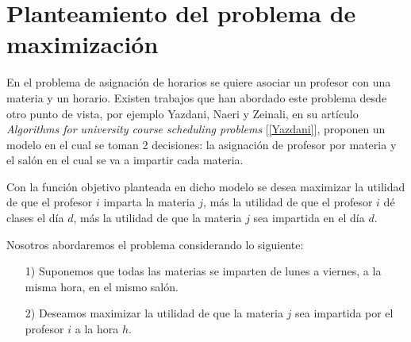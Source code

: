 

  
%
%

  
  
  \section{Planteamiento del problema de maximización}

En el problema de asignación de horarios se quiere asociar un profesor con una materia y un horario. Existen trabajos que han abordado este problema desde otro punto de vista, por ejemplo Yazdani, Naeri y Zeinali, en su artículo \textit{Algorithms for university course scheduling problems} [\ref{Yazdani}], proponen un modelo en el cual se toman 2 decisiones: la asignación de profesor por materia y el salón en el cual se va a impartir cada materia.

Con la función objetivo planteada en dicho modelo se desea maximizar la utilidad de que el profesor $i$ imparta la materia $j$, más la utilidad de que el profesor $i$ dé clases el día $d$, más la utilidad de que la materia $j$ sea impartida en el día $d$.

Nosotros abordaremos el problema considerando lo siguiente: %

\begin{enumerate}
\item[1)] Suponemos que todas las materias se imparten de lunes a viernes, a la misma hora, en el mismo salón. %

\item[2)] Deseamos maximizar la utilidad de que la materia $j$ sea impartida por  el profesor $i$ a la hora $h$.
\end{enumerate}

